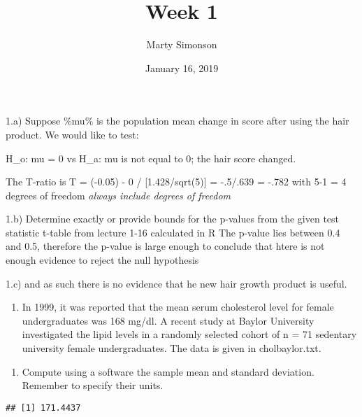 \documentclass[]{article}
\title{Week 1}
\author{Marty Simonson}
\date{January 16, 2019}
\newenvironment{Shaded}{\begin{snugshade}}{\end{snugshade}}
\newcommand{\KeywordTok}[1]{\textcolor[rgb]{0.13,0.29,0.53}{\textbf{#1}}}
\newcommand{\OperatorTok}[1]{\textcolor[rgb]{0.81,0.36,0.00}{\textbf{#1}}}
\newcommand{\NormalTok}[1]{#1}
\providecommand{\tightlist}{%
  \setlength{\itemsep}{0pt}\setlength{\parskip}{0pt}}
\begin{document}
\maketitle

1.a) Suppose \%mu\% is the population mean change in score after using
the hair product. We would like to test:

H\_o: mu = 0 vs H\_a: mu is not equal to 0; the hair score changed.

The T-ratio is T = (-0.05) - 0 / {[}1.428/sqrt(5){]} = -.5/.639 = -.782
with 5-1 = 4 degrees of freedom \emph{always include degrees of freedom}

1.b) Determine exactly or provide bounds for the p-values from the given
test statistic t-table from lecture 1-16 calculated in R The p-value
lies between 0.4 and 0.5, therefore the p-value is large enough to
conclude that htere is not enough evidence to reject the null hypothesis

1.c) and as such there is no evidence that he new hair growth product is
useful.

\begin{enumerate}
\def\labelenumi{\arabic{enumi}.}
\setcounter{enumi}{1}
\tightlist
\item
  In 1999, it was reported that the mean serum cholesterol level for
  female undergraduates was 168 mg/dl. A recent study at Baylor
  University investigated the lipid levels in a randomly selected cohort
  of n = 71 sedentary university female undergraduates. The data is
  given in cholbaylor.txt.
\end{enumerate}

\begin{enumerate}
\def\labelenumi{\alph{enumi})}
\tightlist
\item
  Compute using a software the sample mean and standard deviation.
  Remember to specify their units.
\end{enumerate}

\begin{Shaded}
\end{Shaded}

\begin{verbatim}
## [1] 171.4437
\end{verbatim}

\begin{Shaded}
\end{Shaded}
\end{document}
